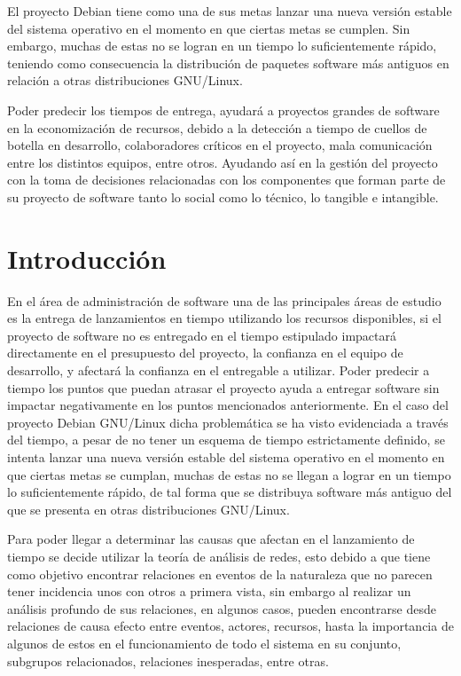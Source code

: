 \documentclass[12pt]{report}
\begin{document}
El  proyecto Debian  tiene  como una  de sus  metas  lanzar una  nueva
versión estable  del sistema  operativo en el  momento en  que ciertas
metas se  cumplen.  Sin embargo,  muchas de estas  no se logran  en un
tiempo  lo  suficientemente  rápido,  teniendo  como  consecuencia  la
distribución de  paquetes software  más antiguos  en relación  a otras
distribuciones GNU/Linux.

Poder predecir los tiempos de  entrega, ayudará a proyectos grandes de
software  en la  economización de  recursos, debido  a la  detección a
tiempo de cuellos de botella  en desarrollo, colaboradores críticos en
el  proyecto, mala  comunicación  entre los  distintos equipos,  entre
otros.   Ayudando así  en  la  gestión del  proyecto  con  la toma  de
decisiones relacionadas  con los  componentes que  forman parte  de su
proyecto de  software tanto lo social  como lo técnico, lo  tangible e
intangible.

\chapter*{Introducción}
En el área de administración de  software una de las principales áreas
de  estudio es  la entrega  de lanzamientos  en tiempo  utilizando los
recursos disponibles, si el proyecto de software no es entregado en el
tiempo  estipulado  impactará  directamente   en  el  presupuesto  del
proyecto,  la confianza  en el  equipo  de desarrollo,  y afectará  la
confianza en  el entregable  a utilizar. Poder  predecir a  tiempo los
puntos que  puedan atrasar el  proyecto ayuda a entregar  software sin
impactar negativamente en los puntos mencionados anteriormente.  En el
caso  del proyecto  Debian GNU/Linux  dicha problemática  se ha  visto
evidenciada a  través del tiempo,  a pesar de  no tener un  esquema de
tiempo  estrictamente definido,  se intenta  lanzar una  nueva versión
estable del  sistema operativo en el  momento en que ciertas  metas se
cumplan,  muchas de  estas  no se  llegan  a lograr  en  un tiempo  lo
suficientemente rápido,  de tal forma  que se distribuya  software más
antiguo del que se presenta en otras distribuciones GNU/Linux.

Para  poder  llegar  a  determinar   las  causas  que  afectan  en  el
lanzamiento  de tiempo  se decide  utilizar la  teoría de  análisis de
redes, esto debido  a que tiene como objetivo  encontrar relaciones en
eventos  de la  naturaleza que  no parecen  tener incidencia  unos con
otros a primera vista, sin embargo al realizar un análisis profundo de
sus relaciones, en algunos  casos, pueden encontrarse desde relaciones
de causa efecto entre eventos, actores, recursos, hasta la importancia
de algunos  de estos  en el  funcionamiento de todo  el sistema  en su
conjunto, subgrupos relacionados, relaciones inesperadas, entre otras.
\end{document}
